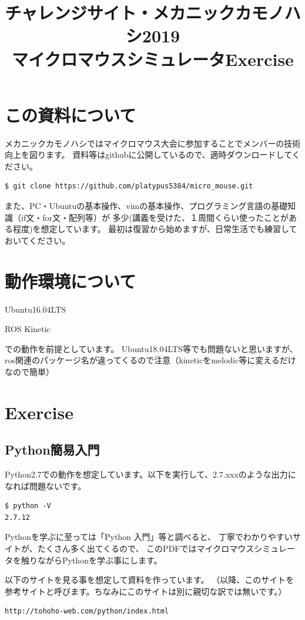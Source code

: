 \documentclass[11pt,a4paper]{jsarticle}
\title{チャレンジサイト・メカニックカモノハシ2019\\マイクロマウスシミュレータExercise}
\begin{document}
\maketitle
%
%
\section{この資料について}
メカニックカモノハシではマイクロマウス大会に参加することでメンバーの技術向上を図ります。
資料等はgithubに公開しているので、適時ダウンロードしてください。

\begin{lstlisting}[frame=single]
$ git clone https://github.com/platypus5384/micro_mouse.git
\end{lstlisting}

また、PC・Ubuntuの基本操作、vimの基本操作、プログラミング言語の基礎知識（if文・for文・配列等）が
多少(講義を受けた、１周間くらい使ったことがある程度)を想定しています。
最初は復習から始めますが、日常生活でも練習しておいてください。


\section{動作環境について}
Ubuntu16.04LTS

ROS Kinetic

での動作を前提としています。
Ubuntu18.04LTS等でも問題ないと思いますが、ros関連のパッケージ名が違ってくるので注意（kineticをmelodic等に変えるだけなので簡単）


\newpage




\section{Exercise}
\subsection{Python簡易入門}
Python2.7での動作を想定しています。以下を実行して、2.7.xxxのような出力になれば問題ないです。
\begin{lstlisting}[frame=single]
$ python -V
2.7.12
\end{lstlisting}

Pythonを学ぶに至っては「Python 入門」等と調べると、
丁寧でわかりやすいサイトが、たくさん多く出てくるので、
このPDFではマイクロマウスシミュレータを触りながらPythonを学ぶ事にします。

以下のサイトを見る事を想定して資料を作っています。
（以降、このサイトを参考サイトと呼びます。ちなみにこのサイトは別に親切な訳では無いです。）
\begin{lstlisting}[frame=single]
http://tohoho-web.com/python/index.html
\end{lstlisting}
\end{document}

